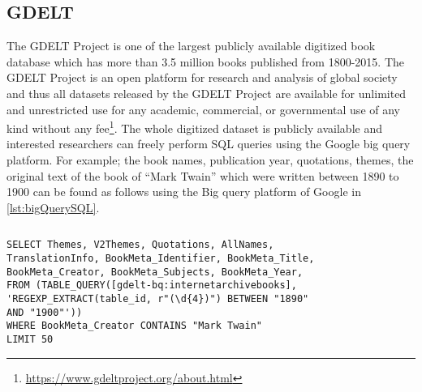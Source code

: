 \subsection{GDELT}
The GDELT Project is one of the largest publicly available digitized book database which has more than 3.5 million books published from 1800-2015. The GDELT Project is an open platform for research and analysis of global society and thus all datasets released by the GDELT Project are available for unlimited and unrestricted use for any academic, commercial, or governmental use of any kind without any fee\footnote{\url{https://www.gdeltproject.org/about.html}}. The whole digitized dataset is publicly available and interested researchers can freely perform SQL queries using the Google big query platform. For example; the book names, publication year, quotations, themes, the original text of the book of “Mark Twain” which were written between 1890 to 1900 can be found as follows
using the Big query platform of Google in \autoref{lst:bigQuerySQL}.
\begin{lstlisting}[linewidth=18cm, frame=none,caption={Google Big Query on GDELT.},captionpos=b,label=lst:bigQuerySQL]
\end{lstlisting}
\begin{lstlisting}
SELECT Themes, V2Themes, Quotations, AllNames, 
TranslationInfo, BookMeta_Identifier, BookMeta_Title, 
BookMeta_Creator, BookMeta_Subjects, BookMeta_Year,
FROM (TABLE_QUERY([gdelt-bq:internetarchivebooks],
'REGEXP_EXTRACT(table_id, r"(\d{4})") BETWEEN "1890" 
AND "1900"'))
WHERE BookMeta_Creator CONTAINS "Mark Twain"
LIMIT 50
\end{lstlisting}

